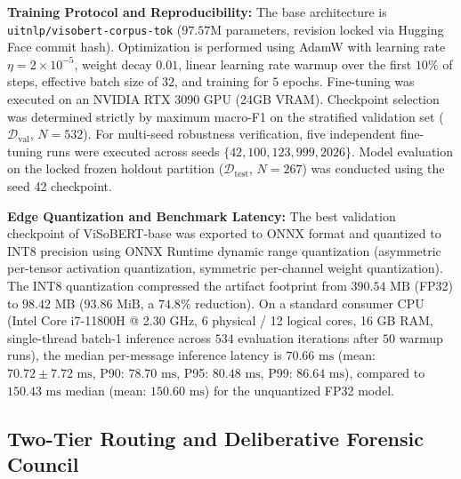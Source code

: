 \textbf{Training Protocol and Reproducibility:} The base architecture is \texttt{uitnlp/visobert-corpus-tok} ($97.57\text{M}$ parameters, revision locked via Hugging Face commit hash). Optimization is performed using AdamW with learning rate $\eta = 2 \times 10^{-5}$, weight decay $0.01$, linear learning rate warmup over the first $10\%$ of steps, effective batch size of $32$, and training for $5$ epochs. Fine-tuning was executed on an NVIDIA RTX 3090 GPU (24GB VRAM). Checkpoint selection was determined strictly by maximum macro-F1 on the stratified validation set ($\mathcal{D}_{\text{val}}$, $N=532$). For multi-seed robustness verification, five independent fine-tuning runs were executed across seeds $\{42, 100, 123, 999, 2026\}$. Model evaluation on the locked frozen holdout partition ($\mathcal{D}_{\text{test}}$, $N=267$) was conducted using the seed 42 checkpoint.

\textbf{Edge Quantization and Benchmark Latency:} The best validation checkpoint of ViSoBERT-base was exported to ONNX format and quantized to INT8 precision using ONNX Runtime dynamic range quantization (asymmetric per-tensor activation quantization, symmetric per-channel weight quantization). The INT8 quantization compressed the artifact footprint from $390.54\text{ MB}$ (FP32) to $98.42\text{ MB}$ ($93.86\text{ MiB}$, a $74.8\%$ reduction). On a standard consumer CPU (Intel Core i7-11800H @ 2.30 GHz, 6 physical / 12 logical cores, 16 GB RAM, single-thread batch-1 inference across $534$ evaluation iterations after $50$ warmup runs), the median per-message inference latency is $70.66\text{ ms}$ (mean: $70.72 \pm 7.72\text{ ms}$, P90: $78.70\text{ ms}$, P95: $80.48\text{ ms}$, P99: $86.64\text{ ms}$), compared to $150.43\text{ ms}$ median (mean: $150.60\text{ ms}$) for the unquantized FP32 model.

\subsection{Two-Tier Routing and Deliberative Forensic Council}
\label{subsec:routing_council}

